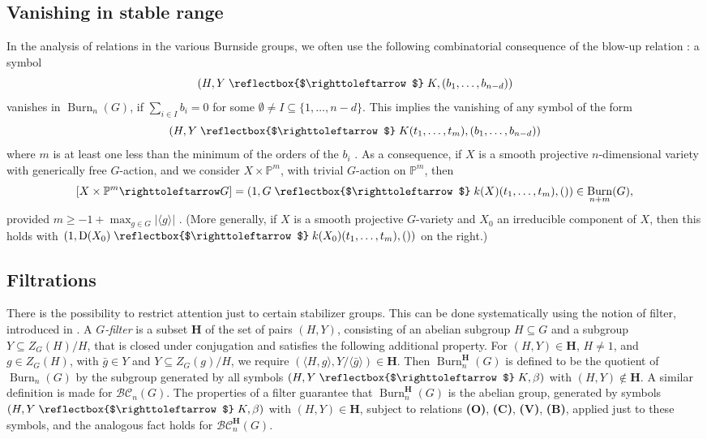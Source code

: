 \documentclass[12pt,reqno]{amsart}
\theoremstyle{plain}
\theoremstyle{remark}
\theoremstyle{definition}
\numberwithin{equation}{section}
\newcommand{\bP}{{\mathbb P}}
\newcommand{\BC}{{\mathcal B}{\mathcal C}}
\newcommand{\actsfromleft}{\mathrel{\reflectbox{$\righttoleftarrow$}}}
\newcommand{\actsfromright}{\righttoleftarrow}
\DeclareMathOperator{\Burn}{Burn}
\begin{document}
\subsection{Vanishing in stable range}
\label{sect:vanishing}

In the analysis of relations in the various Burnside groups, we often use the following combinatorial consequence of the blow-up relation \cite[Prop.\ 4.7(i)]{BnG}: 
a symbol
$$
(H, Y\actsfromleft K, (b_1,\ldots, b_{n-d})) 
$$
vanishes in $\Burn_n(G)$, if $\sum_{i\in I}b_i=0$ for some $\emptyset\ne I\subseteq \{1,\dots,n-d\}$.
This implies the vanishing of any symbol of the form
\[ (H, Y\actsfromleft K(t_1,\dots,t_m), (b_1,\ldots, b_{n-d})) \]
where $m$ is at least one less than the minimum of the orders of the $b_i$ \cite[Prop.\ 4.1]{KT-toric}.
As a consequence, if $X$ is a smooth projective $n$-dimensional variety with generically free $G$-action, and we consider $X\times \bP^m$, with trivial $G$-action on $\bP^m$, then
$$
[X\times \bP^m\actsfromright G]=(1, G\actsfromleft k(X)(t_1,\ldots, t_m), ())\in \Burn_{n+m}(G),
$$
provided $m\ge -1+\max_{g\in G}|\langle g\rangle|$ \cite[Rmk.\ 4.2]{KT-toric}. 
(More generally, if $X$ is a smooth projective $G$-variety and $X_0$ an irreducible component of $X$, then this holds with $(1,\mathrm{D}(X_0)\actsfromleft k(X_0)(t_1,\dots,t_m),())$ on the right.)





\subsection{Filtrations}
\label{sect:filtration}
There is the possibility to restrict attention just to certain
stabilizer groups.
This can be done systematically using the notion of filter,
introduced in \cite[\S 3]{KT-struct}.
A \emph{$G$-filter} is a subset $\mathbf{H}$ of the set of pairs $(H,Y)$, consisting of an abelian subgroup $H\subseteq G$ and a subgroup $Y\subseteq Z_G(H)/H$,
that is closed under conjugation and satisfies the following additional property.
For $(H,Y)\in \mathbf{H}$, $H\ne 1$, and $g\in Z_G(H)$, with
$\bar g\in Y$ and $Y\subseteq Z_G(g)/H$, we require
$(\langle H,g\rangle,Y/\langle \bar g\rangle)\in \mathbf{H}$.
Then
$\Burn_n^{\mathbf{H}}(G)$
is defined to be the quotient of $\Burn_n(G)$ by the subgroup generated by all symbols $(H,Y\actsfromleft K,\beta)$ with $(H,Y)\notin \mathbf{H}$.
A similar definition is made for $\BC_n(G)$.
The properties of a filter guarantee \cite[Prop.\ 3.3, Prop.\ 8.7]{KT-struct} that
$\Burn_n^{\mathbf{H}}(G)$ is the abelian group,
generated by symbols $(H,Y\actsfromleft K,\beta)$ with $(H,Y)\in \mathbf{H}$, subject to relations
\textbf{(O)}, \textbf{(C)}, \textbf{(V)}, \textbf{(B)}, applied just to these symbols,
and the analogous fact holds for $\BC_n^{\mathbf{H}}(G)$.
\end{document}
